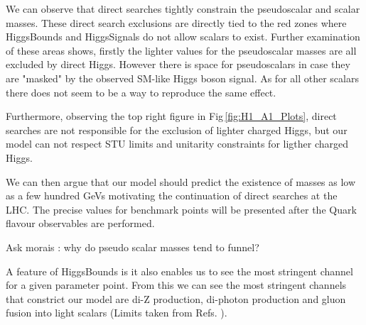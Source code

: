 %
We can observe that direct searches tightly constrain the pseudoscalar and scalar masses. 
%
These direct search exclusions are directly tied to the red zones where HiggsBounds and HiggsSignals do not allow scalars to exist. 
%
Further examination of these areas shows, firstly the lighter values for the pseudoscalar masses are all excluded by direct Higgs. However there is space for pseudoscalars in case they are "masked" by the observed SM-like Higgs boson signal.  
%
As for all other scalars there does not seem to be a way to reproduce the same effect. 

Furthermore, observing the top right figure in Fig\,\ref{fig:H1_A1_Plots}, direct searches are not responsible for the exclusion of lighter charged Higgs, but our model can not respect STU limits and unitarity constraints for ligther charged Higgs.  

%
We can then argue that our model should predict the existence of masses as low as a few hundred GeVs motivating the continuation of direct searches at the LHC. 
%
The precise values for benchmark points will be presented after the Quark flavour observables are performed. 

{ \color{red} Ask morais : why do pseudo scalar masses tend to funnel? }  


A feature of HiggsBounds is it also enables us to see the most stringent channel for a given parameter point. 
%
From this we can see the most stringent channels that constrict our model are di-Z production, di-photon production and gluon fusion into light scalars (Limits taken from Refs. \cite{Aad_2014,CMS-PAS-HIG-14-029,Khachatryan_2015,Abazov_2011}). 
%
%
%

